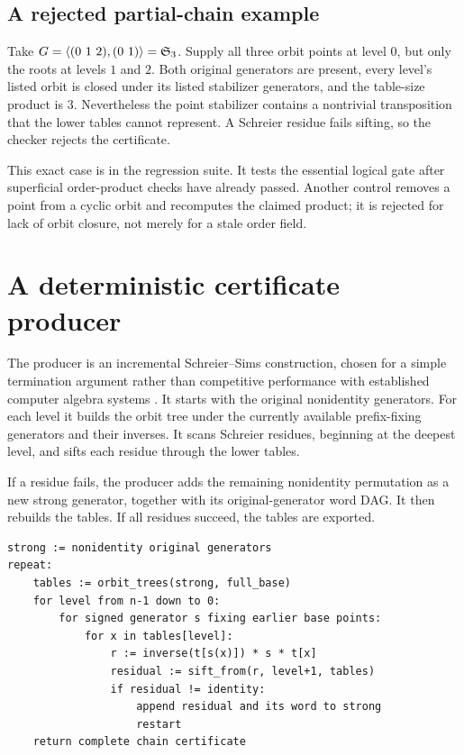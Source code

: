 \subsection{A rejected partial-chain example}
Take $G=\langle(0\ 1\ 2),(0\ 1)\rangle=\Sym_3$. Supply all three orbit points at level $0$, but only the roots at levels $1$ and $2$. Both original generators are present, every level's listed orbit is closed under its listed stabilizer generators, and the table-size product is $3$. Nevertheless the point stabilizer contains a nontrivial transposition that the lower tables cannot represent. A Schreier residue fails sifting, so the checker rejects the certificate.

This exact case is in the regression suite. It tests the essential logical gate after superficial order-product checks have already passed. Another control removes a point from a cyclic orbit and recomputes the claimed product; it is rejected for lack of orbit closure, not merely for a stale order field.

\section{A deterministic certificate producer}
\label{sec:producer}
The producer is an incremental Schreier--Sims construction, chosen for a simple termination argument rather than competitive performance with established computer algebra systems \cite{gap,sympy}. It starts with the original nonidentity generators. For each level it builds the orbit tree under the currently available prefix-fixing generators and their inverses. It scans Schreier residues, beginning at the deepest level, and sifts each residue through the lower tables.

If a residue fails, the producer adds the remaining nonidentity permutation as a new strong generator, together with its original-generator word DAG. It then rebuilds the tables. If all residues succeed, the tables are exported.

\begin{lstlisting}
strong := nonidentity original generators
repeat:
    tables := orbit_trees(strong, full_base)
    for level from n-1 down to 0:
        for signed generator s fixing earlier base points:
            for x in tables[level]:
                r := inverse(t[s(x)]) * s * t[x]
                residual := sift_from(r, level+1, tables)
                if residual != identity:
                    append residual and its word to strong
                    restart
    return complete chain certificate
\end{lstlisting}

